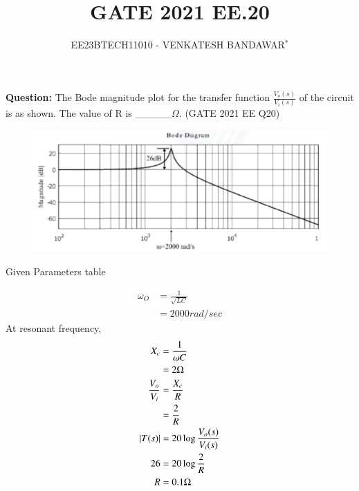 \documentclass[journal,12pt,twocolumn]{IEEEtran}
\theoremstyle{remark}
\begin{document}

\vspace{3cm}

\title{GATE 2021 EE.20}
\author{EE23BTECH11010 - VENKATESH BANDAWAR$^{*}$%
}
\maketitle
\newpage
\bigskip
\textbf{Question:} The Bode magnitude plot for the transfer function $\frac{V_o(s)}{V_i(s)}$ of the circuit is as shown. The value of R is \_\_\_\_\_$\Omega$. \hfill(GATE 2021 EE Q20)
\begin{figure}[!ht]
    \centering
    
\end{figure}
\begin{figure}[!ht]
    \centering
    \includegraphics[width=\columnwidth]{figs/bode.png}
\end{figure}
\solution
\begin{table}[!ht]
    \centering
    
    \caption{Given Parameters table}
    \label{Given Parameters table_2021_EE_20}
\end{table}
\begin{align}
    \omega_O &= \frac{1}{\sqrt{LC}}\\
    &= 2000rad/sec
\end{align}
At resonant frequency, 
\begin{align}
    X_c &= \frac{1}{\omega C}\\
    &= 2 \Omega\\
     \frac{V_o}{V_i} &= \frac{X_c}{R} \\
     &= \frac{2}{R}\\
     \left\vert T(s)\right\vert &= 20 \log\frac{V_o(s)}{V_i(s)}\\
     26 &= 20 \log\frac{2}{R}\\
     R &= 0.1 \Omega
\end{align}
\end{document}
